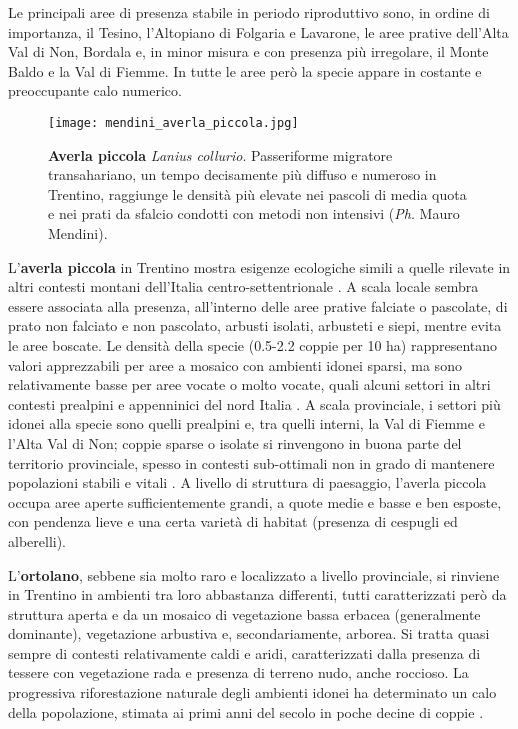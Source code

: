\documentclass[10pt,twoside,openany,x11names,svgnames,italian,a5paper,dvipsnames,table]{memoir}
\newcommand{\ph}{\emph{Ph}. }
\begin{document}
Le principali aree di presenza stabile in periodo riproduttivo sono, in ordine di importanza, il Tesino, l’Altopiano di Folgaria e Lavarone, le aree prative dell’Alta Val di Non, Bordala e, in minor misura e con presenza più irregolare, il Monte Baldo e la Val di Fiemme. In tutte le aree però la specie appare in costante e preoccupante calo numerico. 

\begin{wrapfigure}{l}{.6\columnwidth}
\centering
  \texttt{[image: mendini\_averla\_piccola.jpg]}
  \caption*{\textbf{Averla piccola} \emph{Lanius collurio}. Passeriforme migratore transahariano, un tempo decisamente più diffuso e numeroso in Trentino, raggiunge le densità più elevate nei pascoli di media quota e nei prati da sfalcio condotti con metodi non intensivi (\ph Mauro Mendini).}
\end{wrapfigure}


L'\textbf{averla piccola} in Trentino mostra esigenze ecologiche simili a quelle rilevate in altri contesti montani dell’Italia centro-settentrionale \cite{Ceresa12}. A scala locale sembra essere associata alla presenza, all'interno delle aree prative falciate o pascolate, di prato non falciato e non pascolato, arbusti isolati, arbusteti e siepi, mentre evita le aree boscate. Le densità della specie (0.5-2.2 coppie per 10 ha) rappresentano valori apprezzabili per aree a mosaico con ambienti idonei sparsi, ma sono relativamente basse per aree vocate o molto vocate, quali alcuni settori in altri contesti prealpini e appenninici del nord Italia \cite{Ceresa12}. A scala provinciale, i settori più idonei alla specie sono quelli prealpini e, tra quelli interni, la Val di Fiemme e l'Alta Val di Non; coppie sparse o isolate si rinvengono in buona parte del territorio provinciale, spesso in contesti sub-ottimali non in grado di mantenere popolazioni stabili e vitali \cite{Pedrini05}. A livello di struttura di paesaggio, l'averla piccola occupa aree aperte sufficientemente grandi, a quote medie e basse e ben esposte, con pendenza lieve e una certa varietà di habitat (presenza di cespugli ed alberelli).


L'\textbf{ortolano}, sebbene sia molto raro e localizzato a livello provinciale, si rinviene in Trentino in ambienti tra loro abbastanza differenti, tutti caratterizzati però da struttura aperta e da un mosaico di vegetazione bassa erbacea (generalmente dominante), vegetazione arbustiva e, secondariamente, arborea. Si tratta quasi sempre di contesti relativamente caldi e aridi, caratterizzati dalla presenza di tessere con vegetazione rada e presenza di terreno nudo, anche roccioso. La progressiva riforestazione naturale degli ambienti idonei ha determinato un calo della popolazione, stimata ai primi anni del secolo in poche decine di coppie \cite{Pedrini05}. 
\end{document}
